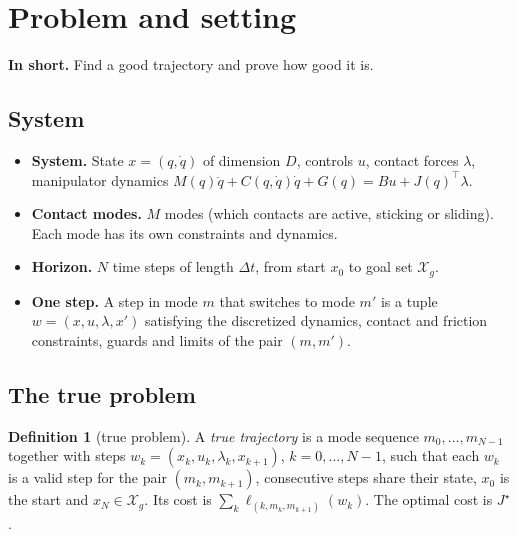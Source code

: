 \documentclass[11pt]{article}
\newcommand{\inshort}[1]{\par\noindent\textcolor{accent}{\textbf{In short.}} #1\par\smallskip}
\theoremstyle{plain}
\theoremstyle{definition}
\newtheorem{definition}[theorem]{Definition}
\theoremstyle{remark}
\begin{document}
\section{Problem and setting}
\inshort{Find a good trajectory and prove how good it is.}

\subsection{System}
\begin{itemize}[leftmargin=1.2em]
  \item \textbf{System.} State $x=(q,\dot q)$ of dimension $D$, controls $u$, contact forces $\lambda$, manipulator dynamics $M(q)\ddot q+C(q,\dot q)\dot q+G(q)=Bu+J(q)^\top\lambda$.
  \item \textbf{Contact modes.} $M$ modes (which contacts are active, sticking or sliding). Each mode has its own constraints and dynamics.
  \item \textbf{Horizon.} $N$ time steps of length $\Delta t$, from start $x_0$ to goal set $\mathcal X_g$.
  \item \textbf{One step.} A step in mode $m$ that switches to mode $m'$ is a tuple $w=(x,u,\lambda,x')$ satisfying the discretized dynamics, contact and friction constraints, guards and limits of the pair $(m,m')$.
\end{itemize}

\subsection{The true problem}
\begin{definition}[true problem]\label{def:true}
A \emph{true trajectory} is a mode sequence $m_0,\dots,m_{N-1}$ together with steps $w_k=(x_k,u_k,\lambda_k,x_{k+1})$, $k=0,\dots,N-1$, such that each $w_k$ is a valid step for the pair $(m_k,m_{k+1})$, consecutive steps share their state, $x_0$ is the start and $x_N\in\mathcal X_g$. Its cost is $\sum_k\ell_{(k,m_k,m_{k+1})}(w_k)$. The optimal cost is $J^\star$.
\end{definition}
\end{document}
